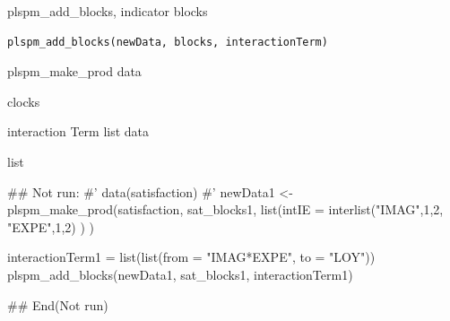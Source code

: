 \documentclass[a4paper]{book}
\begin{document}
%
\begin{Description}
plspm\_add\_blocks, indicator blocks
\end{Description}
%
\begin{Usage}
\begin{verbatim}
plspm_add_blocks(newData, blocks, interactionTerm)
\end{verbatim}
\end{Usage}
%
\begin{Arguments}
\begin{ldescription}
\item[\code{newData}] plspm\_make\_prod data

\item[\code{blocks}] clocks

\item[\code{interactionTerm}] interaction Term list data
\end{ldescription}
\end{Arguments}
%
\begin{Value}
list
\end{Value}
%
\begin{Examples}
\begin{ExampleCode}
\#\# Not run: 
#' data(satisfaction)
#'
newData1 <- plspm_make_prod(satisfaction, sat_blocks1,
                            list(intIE = interlist("IMAG",1,2, "EXPE",1,2) ) )


interactionTerm1 = list(list(from = "IMAG*EXPE", to = "LOY"))
plspm_add_blocks(newData1, sat_blocks1, interactionTerm1)


## End(Not run)

\end{ExampleCode}
\end{Examples}
\end{document}
